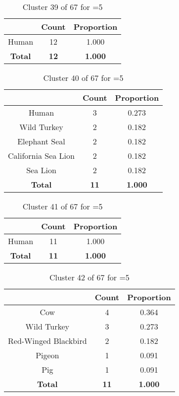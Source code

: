 \begin{table}[ht!]
\centering
\begin{tabular}{|c|c|c|}
\hline
\bf \Spec{} &\bf Count &\bf Proportion\\ \hline \hline
Human & 12 & 1.000\\ \hline
\hline
\bf Total & \bf 12 & \bf 1.000\\ \hline
\end{tabular}
\label{tab:cluster:39:5}
\caption{Cluster 39 of 67 for \minneigh{}=5}
\end{table}

\clearpage
\begin{table}[ht!]
\centering
\begin{tabular}{|c|c|c|}
\hline
\bf \Spec{} &\bf Count &\bf Proportion\\ \hline \hline
Human & 3 & 0.273\\ \hline
Wild Turkey & 2 & 0.182\\ \hline
Elephant Seal & 2 & 0.182\\ \hline
California Sea Lion & 2 & 0.182\\ \hline
Sea Lion & 2 & 0.182\\ \hline
\hline
\bf Total & \bf 11 & \bf 1.000\\ \hline
\end{tabular}
\label{tab:cluster:40:5}
\caption{Cluster 40 of 67 for \minneigh{}=5}
\end{table}

\begin{table}[ht!]
\centering
\begin{tabular}{|c|c|c|}
\hline
\bf \Spec{} &\bf Count &\bf Proportion\\ \hline \hline
Human & 11 & 1.000\\ \hline
\hline
\bf Total & \bf 11 & \bf 1.000\\ \hline
\end{tabular}
\label{tab:cluster:41:5}
\caption{Cluster 41 of 67 for \minneigh{}=5}
\end{table}

\begin{table}[ht!]
\centering
\begin{tabular}{|c|c|c|}
\hline
\bf \Spec{} &\bf Count &\bf Proportion\\ \hline \hline
Cow & 4 & 0.364\\ \hline
Wild Turkey & 3 & 0.273\\ \hline
Red-Winged Blackbird & 2 & 0.182\\ \hline
Pigeon & 1 & 0.091\\ \hline
Pig & 1 & 0.091\\ \hline
\hline
\bf Total & \bf 11 & \bf 1.000\\ \hline
\end{tabular}
\label{tab:cluster:42:5}
\caption{Cluster 42 of 67 for \minneigh{}=5}
\end{table}

